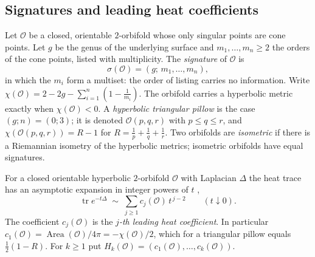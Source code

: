 %

\newcommand{\Pill}{\mathcal{P}}          %
\newcommand{\Orb}{\mathcal{O}}           %
\newcommand{\Kiso}{K_{\mathrm{iso}}}
\newcommand{\Kmult}{K_{\mathrm{mult}}}

\subsection{Signatures and leading heat coefficients}\label{subsec:defs}

\begin{definition}[Signature]\label{def:signature}
Let $\Orb$ be a closed, orientable $2$-orbifold whose only singular points are cone points.
Let $g$ be the genus of the underlying surface and $m_1,\dots,m_n\ge2$ the orders of the cone
points, listed with multiplicity. The \emph{signature} of $\Orb$ is
\[
  \sigma(\Orb)=(g;\,m_1,\dots,m_n),
\]
in which the $m_i$ form a multiset: the order of listing carries no information. Write
$\chi(\Orb)=2-2g-\sum_{i=1}^n(1-\tfrac1{m_i})$. The orbifold carries a hyperbolic metric exactly
when $\chi(\Orb)<0$. A \emph{hyperbolic triangular pillow} is the case $(g;n)=(0;3)$; it is
denoted $\Orb(p,q,r)$ with $p\le q\le r$, and $\chi(\Orb(p,q,r))=R-1$ for
$R=\tfrac1p+\tfrac1q+\tfrac1r$. Two orbifolds are \emph{isometric} if there is a Riemannian
isometry of the hyperbolic metrics; isometric orbifolds have equal signatures.
\end{definition}

\begin{definition}\label{def:heatcoef}
For a closed orientable hyperbolic $2$-orbifold $\Orb$ with Laplacian $\Delta$ the heat trace
has an asymptotic expansion in integer powers of $t$ \cite{donnelly1976, dggw2008},
\[
  \operatorname{tr}e^{-t\Delta}\;\sim\;\sum_{j\ge1}c_j(\Orb)\,t^{\,j-2}\qquad(t\downarrow0).
\]
The coefficient $c_j(\Orb)$ is the \emph{$j$-th leading heat coefficient}. In particular
$c_1(\Orb)=\operatorname{Area}(\Orb)/4\pi=-\chi(\Orb)/2$, which for a triangular pillow equals
$\tfrac12(1-R)$. For $k\ge1$ put $H_k(\Orb)=(c_1(\Orb),\dots,c_k(\Orb))$.
\end{definition}


